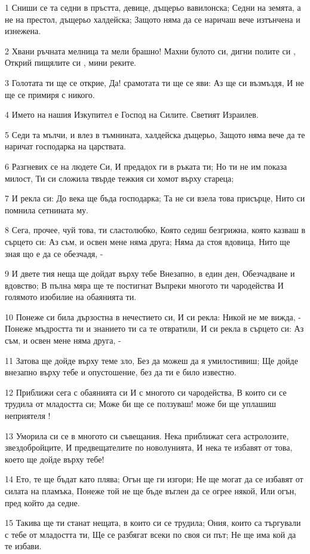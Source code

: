 \par 1 Сниши се та седни в пръстта, девице, дъщерьо вавилонска; Седни на земята, а не на престол, дъщерьо халдейска; Защото няма да се наричаш вече изтънчена и изнежена.
\par 2 Хвани ръчната мелница та мели брашно! Махни булото си, дигни полите си , Открий пищялите си , мини реките.
\par 3 Голотата ти ще се открие, Да! срамотата ти ще се яви: Аз ще си възмъздя, И не ще се примиря с никого.
\par 4 Името на нашия Изкупител е Господ на Силите. Светият Израилев.
\par 5 Седи та мълчи, и влез в тъмнината, халдейска дъщерьо, Защото няма вече да те наричат господарка на царствата.
\par 6 Разгневих се на людете Си, И предадох ги в ръката ти; Но ти не им показа милост, Ти си сложила твърде тежкия си хомот върху стареца;
\par 7 И рекла си: До века ще бъда господарка; Та не си взела това присърце, Нито си помнила сетнината му.
\par 8 Сега, прочее, чуй това, ти сластолюбко, Която седиш безгрижна, която казваш в сърцето си: Аз съм, и освен мене няма друга; Няма да стоя вдовица, Нито ще зная що е да се обезчадя, -
\par 9 И двете тия неща ще дойдат върху тебе Внезапно, в един ден, Обезчадване и вдовство; В пълна мяра ще те постигнат Въпреки многото ти чародейства И голямото изобилие на обаянията ти.
\par 10 Понеже си била дързостна в нечестието си, И си рекла: Никой не ме вижда, - Понеже мъдростта ти и знанието ти са те отвратили, И си рекла в сърцето си: Аз съм, и освен мене няма друга, -
\par 11 Затова ще дойде върху теме зло, Без да можеш да я умилостивиш; Ще дойде внезапно върху тебе и опустошение, без да ти е било известно.
\par 12 Приближи сега с обаянията си И с многото си чародейства, В които си се трудила от младостта си; Може би ще се ползуваш! може би ще уплашиш неприятеля !
\par 13 Уморила си се в многото си съвещания. Нека приближат сега астролозите, звездобройците, И предвещателите по новолунията, И нека те избавят от това, което ще дойде върху тебе!
\par 14 Ето, те ще бъдат като плява; Огън ще ги изгори; Не ще могат да се избавят от силата на пламъка, Понеже той не ще бъде въглен да се огрее някой, Или огън, пред който да седне.
\par 15 Такива ще ти станат нещата, в които си се трудила; Ония, които са търгували с тебе от младостта ти, Ще се разбягат всеки по своя си път; Не ще има кой да те избави.

